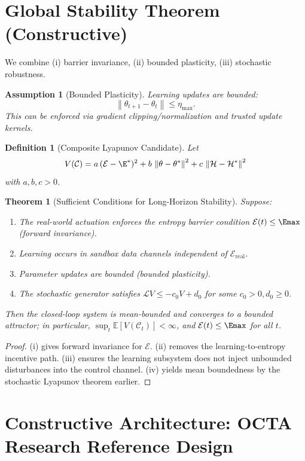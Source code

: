 \documentclass[11pt]{article}
\newtheorem{definition}{Definition}
\newtheorem{assumption}{Assumption}
\newtheorem{theorem}{Theorem}
\newcommand{\Eenv}{\mathcal{E}}     %
\newcommand{\Hsys}{\mathcal{H}}     %
\newcommand{\Civ}{\mathcal{C}}      %
\newcommand{\norm}[1]{\left\lVert #1\right\rVert}
\begin{document}
\section{Global Stability Theorem (Constructive)}

We combine (i) barrier invariance, (ii) bounded plasticity, (iii) stochastic robustness.

\begin{assumption}[Bounded Plasticity]
Learning updates are bounded:
\[
\norm{\theta_{t+1}-\theta_t}\le \eta_{\max}.
\]
This can be enforced via gradient clipping/normalization and trusted update kernels.
\end{assumption}

\begin{definition}[Composite Lyapunov Candidate]
Let
\[
V(\Civ) =
a\,(\Eenv-\E^*)^2
+ b\,\norm{\theta-\theta^*}^2
+ c\,\norm{\Hsys-\Hsys^*}^2
\]
with $a,b,c>0$.
\end{definition}

\begin{theorem}[Sufficient Conditions for Long-Horizon Stability]
Suppose:
\begin{enumerate}[label=(\roman*)]
\item The real-world actuation enforces the entropy barrier condition $\Eenv(t)\le \Emax$ (forward invariance).
\item Learning occurs in sandbox data channels independent of $\Eenv_{\mathrm{real}}$.
\item Parameter updates are bounded (bounded plasticity).
\item The stochastic generator satisfies $\mathcal{L}V\le -c_0 V + d_0$ for some $c_0>0, d_0\ge 0$.
\end{enumerate}
Then the closed-loop system is mean-bounded and converges to a bounded attractor; in particular, $\sup_t \mathbb{E}[V(\Civ_t)]<\infty$, and $\Eenv(t)\le \Emax$ for all $t$.
\end{theorem}

\begin{proof}
(i) gives forward invariance for $\Eenv$. (ii) removes the learning-to-entropy incentive path. (iii) ensures the learning subsystem does not inject unbounded disturbances into the control channel. (iv) yields mean boundedness by the stochastic Lyapunov theorem earlier.
\end{proof}

\section{Constructive Architecture: OCTA Research Reference Design}
\end{document}
